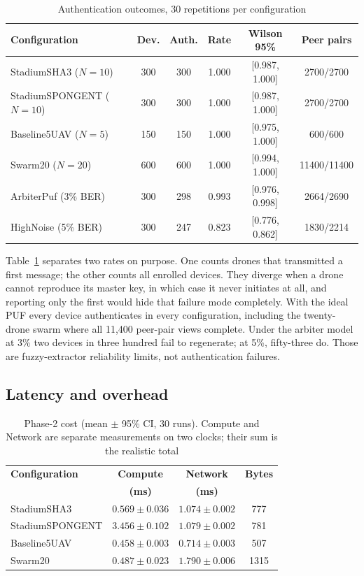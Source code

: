 \documentclass[conference]{IEEEtran}
\begin{document}
\begin{table}[H]
\centering
\caption{Authentication outcomes, 30 repetitions per configuration}
\label{tab:functional}
\scriptsize
\setlength{\tabcolsep}{3pt}
\begin{tabular}{@{}lccccc@{}}
\toprule
\textbf{Configuration} & \textbf{Dev.} & \textbf{Auth.} & \textbf{Rate} &
\textbf{Wilson 95\%} & \textbf{Peer pairs} \\
\midrule
StadiumSHA3 ($N{=}10$)     & 300 & 300 & 1.000 & [0.987, 1.000] & 2700/2700 \\
StadiumSPONGENT ($N{=}10$) & 300 & 300 & 1.000 & [0.987, 1.000] & 2700/2700 \\
Baseline5UAV ($N{=}5$)     & 150 & 150 & 1.000 & [0.975, 1.000] & 600/600 \\
Swarm20 ($N{=}20$)         & 600 & 600 & 1.000 & [0.994, 1.000] & 11400/11400 \\
ArbiterPuf (3\% BER)       & 300 & 298 & 0.993 & [0.976, 0.998] & 2664/2690 \\
HighNoise (5\% BER)        & 300 & 247 & 0.823 & [0.776, 0.862] & 1830/2214 \\
\bottomrule
\end{tabular}
\end{table}

Table~\ref{tab:functional} separates two rates on purpose. One counts drones
that transmitted a first message; the other counts all enrolled devices. They
diverge when a drone cannot reproduce its master key, in which case it never
initiates at all, and reporting only the first would hide that failure mode
completely. With the ideal PUF every device authenticates in every
configuration, including the twenty-drone swarm where all 11{,}400 peer-pair
views complete. Under the arbiter model at 3\% two devices in three hundred fail
to regenerate; at 5\%, fifty-three do. Those are fuzzy-extractor reliability
limits, not authentication failures.

\subsection{Latency and overhead}

\begin{table}[H]
\centering
\caption{Phase-2 cost (mean $\pm$ 95\% CI, 30 runs). Compute and Network are
separate measurements on two clocks; their sum is the realistic total}
\label{tab:latency}
\scriptsize
\setlength{\tabcolsep}{2.6pt}
\begin{tabular}{@{}lccc@{}}
\toprule
\textbf{Configuration} & \textbf{Compute} &
\textbf{Network} & \textbf{Bytes} \\
 & \textbf{(ms)} & \textbf{(ms)} & \\
\midrule
StadiumSHA3     & $0.569{\pm}0.036$ & $1.074{\pm}0.002$ & 777 \\
StadiumSPONGENT & $3.456{\pm}0.102$ & $1.079{\pm}0.002$ & 781 \\
Baseline5UAV    & $0.458{\pm}0.003$ & $0.714{\pm}0.003$ & 507 \\
Swarm20         & $0.487{\pm}0.023$ & $1.790{\pm}0.006$ & 1315 \\
\bottomrule
\end{tabular}
\end{table}
\end{document}

